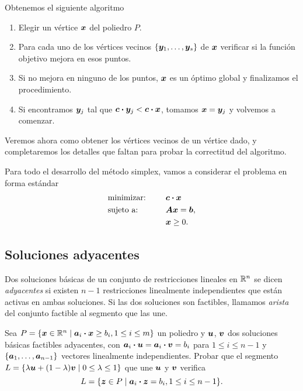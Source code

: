 Obtenemos el siguiente algoritmo
\begin{enumerate}
\item Elegir un vértice $\bm{x}$ del poliedro $P$.
\item Para cada uno de los vértices vecinos $\{\bm{y}_1, \dots, \bm{y}_s\}$ de $\bm{x}$ verificar si la función objetivo mejora en esos puntos.
\item Si no mejora en ninguno de los puntos, $\bm{x}$ es un óptimo global y finalizamos el procedimiento.
\item Si encontramos $\bm{y}_j$ tal que $\bm{c} \boldsymbol{\cdot} \bm{y}_j < \bm{c} \boldsymbol{\cdot} \bm{x}$, tomamos $\bm{x} = \bm{y}_j$ y volvemos a comenzar.
\end{enumerate}

Veremos ahora como obtener los vértices vecinos de un vértice dado, y completaremos los detalles que faltan para probar la correctitud del algoritmo.

Para todo el desarrollo del método simplex, vamos a considerar el problema en forma estándar
\begin{alignat*}{2}
  & \text{minimizar: } & & \bm{c} \boldsymbol{\cdot} \bm{x} \\
   & \text{sujeto a: } & \quad & \bm{A}\bm{x} = \bm{b}, \\
   & & & \bm{x} \ge 0.
\end{alignat*}



\subsection{Soluciones adyacentes}

Dos soluciones básicas de un conjunto de restricciones lineales en $\mathbb{R}^n$ se dicen \emph{adyacentes} si existen $n-1$ restricciones linealmente independientes que están activas en ambas soluciones. Si las dos soluciones son factibles, llamamos \emph{arista} del conjunto factible al segmento que las une.

\begin{ejercicio}
Sea $P = \{\bm{x} \in \mathbb{R}^n \mid \bm{a}_i \boldsymbol{\cdot} \bm{x} \ge b_i,  1 \le i \le m\}$ un poliedro y $\bm{u}$, $\bm{v}$ dos soluciones básicas factibles adyacentes, con $\bm{a}_i \boldsymbol{\cdot} \bm{u} = \bm{a}_i \boldsymbol{\cdot} \bm{v} = b_i$ para $1 \le i \le n-1$ y $\{\bm{a}_1, \dots, \bm{a}_{n-1}\}$ vectores linealmente independientes.
Probar que el segmento $L = \{\lambda \bm{u} + (1-\lambda)\bm{v} \mid 0 \le \lambda \le 1\}$ que une $\bm{u}$ y $\bm{v}$ verifica
$$
L = \{\bm{z} \in P \mid \bm{a}_i \boldsymbol{\cdot} \bm{z} = b_i, 1\le i \le n-1\}.
$$
\end{ejercicio}

